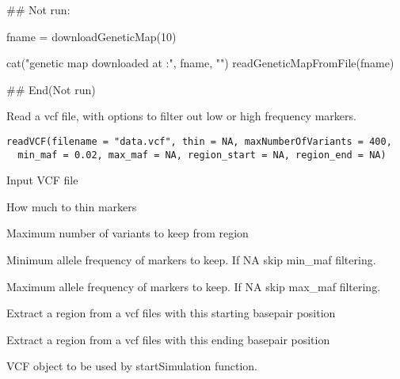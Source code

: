 \documentclass[letterpaper]{book}
\begin{document}
%
\begin{Examples}
\begin{ExampleCode}

## Not run: 

fname = downloadGeneticMap(10)

cat("genetic map downloaded at :", fname, "\n")
readGeneticMapFromFile(fname)


## End(Not run)
\end{ExampleCode}
\end{Examples}
%
\begin{Description}\relax
Read a vcf file, with options to filter out low or high frequency markers.
\end{Description}
%
\begin{Usage}
\begin{verbatim}
readVCF(filename = "data.vcf", thin = NA, maxNumberOfVariants = 400,
  min_maf = 0.02, max_maf = NA, region_start = NA, region_end = NA)
\end{verbatim}
\end{Usage}
%
\begin{Arguments}
\begin{ldescription}
\item[\code{filename}] Input VCF file

\item[\code{thin}] How much to thin markers

\item[\code{maxNumberOfVariants}] Maximum number of variants to keep from region

\item[\code{min\_maf}] Minimum allele frequency of markers to keep. If NA skip min\_maf filtering.

\item[\code{max\_maf}] Maximum allele frequency of markers to keep. If NA skip max\_maf filtering.

\item[\code{region\_start}] Extract a region from a vcf files with this starting basepair position

\item[\code{region\_end}] Extract a region from a vcf files with this ending basepair position
\end{ldescription}
\end{Arguments}
%
\begin{Value}
VCF object to be used by startSimulation function.
\end{Value}
\end{document}
